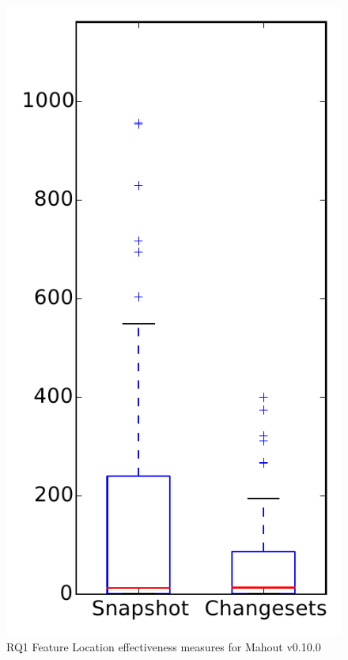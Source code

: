 
\begin{figure}
\centering
\includegraphics[height=0.4\textheight]{figures/flt/rq1_mahout}
\caption{RQ1 Feature Location effectiveness measures for Mahout v0.10.0}
\label{fig:flt:rq1:mahout}
\end{figure}
